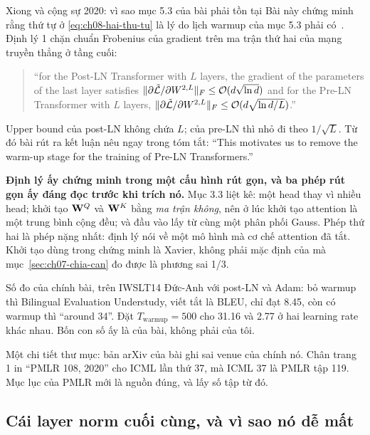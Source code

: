 \begin{bridge}{Xiong và cộng sự 2020: vì sao mục 5.3 của bài phải tồn tại}
%
Bài này chứng minh rằng thứ tự ở \eqref{eq:ch08-hai-thu-tu} là lý do lịch warmup
của mục 5.3 phải có~\autocite{xiong2020layernorm}. Định lý 1 chặn chuẩn
Frobenius của gradient trên ma trận thứ hai của mạng truyền thẳng ở tầng cuối:

\begin{quote}
\enquote{for the Post-LN Transformer with \(L\) layers, the gradient of the
parameters of the last layer satisfies
\(\lVert \partial \tilde{\mathcal{L}} / \partial W^{2,L} \rVert_F \leq
\mathcal{O}(d\sqrt{\ln d})\) and for the Pre-LN Transformer with \(L\) layers,
\(\lVert \partial \tilde{\mathcal{L}} / \partial W^{2,L} \rVert_F \leq
\mathcal{O}(d\sqrt{\ln d / L})\).}
\end{quote}

Upper bound của post-LN không chứa \(L\); của pre-LN thì nhỏ đi theo
\(1/\sqrt{L}\).
Từ đó bài rút ra kết luận nêu ngay trong tóm tắt:
\enquote{This motivates us to remove the warm-up stage for the training of
Pre-LN Transformers.}

\textbf{Định lý ấy chứng minh trong một cấu hình rút gọn, và ba phép rút gọn ấy
đáng đọc trước khi trích nó.} Mục 3.3 liệt kê: một head thay vì nhiều head; khởi
tạo \(\mathbf{W}^Q\) và \(\mathbf{W}^K\) bằng \emph{ma trận không}, nên ở lúc khởi tạo
attention là một trung bình cộng đều; và đầu vào lấy từ cùng một phân phối
Gauss. Phép thứ hai là phép nặng nhất: định lý nói về một mô hình mà cơ chế
attention đã tắt. Khởi tạo dùng trong chứng minh là Xavier, không phải mặc định
của  mà mục~\ref{sec:ch07-chia-can} đo được là phương sai 1/3.

Số đo của chính bài, trên IWSLT14 Đức-Anh với post-LN và Adam: bỏ warmup thì
Bilingual Evaluation Understudy, viết tắt là BLEU, chỉ đạt 8.45, còn có warmup
thì \enquote{around 34}. Đặt
\(T_{\mathrm{warmup}} = 500\) cho 31.16 và 2.77 ở hai learning rate khác nhau.
Bốn con số ấy là của bài, không phải của tôi.

Một chi tiết thư mục: bản arXiv của bài ghi sai venue của chính nó. Chân trang
1 in \enquote{PMLR 108, 2020} cho ICML lần thứ 37, mà ICML 37 là PMLR tập 119.
Mục lục của PMLR mới là nguồn đúng, và  lấy số tập từ đó.
\end{bridge}

\subsection*{Cái layer norm cuối cùng, và vì sao nó dễ mất}

